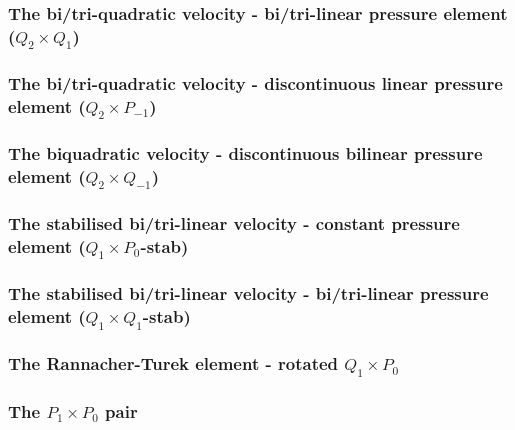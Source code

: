 \subsubsection{The bi/tri-quadratic velocity - bi/tri-linear pressure element ($Q_2 \times Q_1$)}
\label{ss:pairq2q1}


\subsubsection{The bi/tri-quadratic velocity - discontinuous linear pressure element ($Q_2 \times P_{-1}$)}
\label{ss:pairq2pm1}


\subsubsection{The biquadratic velocity - discontinuous bilinear pressure element ($Q_2 \times Q_{-1}$)}
\label{ss:pair_q2qm1}


\subsubsection{The stabilised bi/tri-linear velocity - constant pressure element ($Q_1\times P_0$-stab)}
\label{ss:pairq1p0stab}



\subsubsection{The stabilised bi/tri-linear velocity - bi/tri-linear pressure element ($Q_1\times Q_1$-stab)}
\label{ss:pairq1q1stab}



\subsubsection{The Rannacher-Turek element - rotated ${ Q}_1\times P_0$} \label{ss:RTq1p0}


\subsubsection{The ${ P}_1\times P_0$ pair} \label{ss:p1p0}



